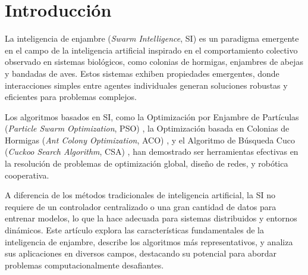 \chapter*{Introducción}


La inteligencia de enjambre (\textit{Swarm Intelligence}, SI) es un paradigma emergente en el campo de la inteligencia artificial inspirado en el comportamiento colectivo observado en sistemas biológicos, como colonias de hormigas, enjambres de abejas y bandadas de aves. Estos sistemas exhiben propiedades emergentes, donde interacciones simples entre agentes individuales generan soluciones robustas y eficientes para problemas complejos. 

Los algoritmos basados en SI, como la Optimización por Enjambre de Partículas (\textit{Particle Swarm Optimization}, PSO) \cite{eberhart1995new}, la Optimización basada en Colonias de Hormigas (\textit{Ant Colony Optimization}, ACO) \cite{dorigo1996ant}, y el Algoritmo de Búsqueda Cuco (\textit{Cuckoo Search Algorithm}, CSA) \cite{yang2009cuckoo}, han demostrado ser herramientas efectivas en la resolución de problemas de optimización global, diseño de redes, y robótica cooperativa.

A diferencia de los métodos tradicionales de inteligencia artificial, la SI no requiere de un controlador centralizado o una gran cantidad de datos para entrenar modelos, lo que la hace adecuada para sistemas distribuidos y entornos dinámicos. Este artículo explora las características fundamentales de la inteligencia de enjambre, describe los algoritmos más representativos, y analiza sus aplicaciones en diversos campos, destacando su potencial para abordar problemas computacionalmente desafiantes.

